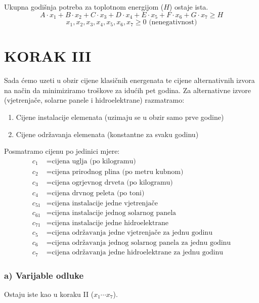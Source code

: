 \documentclass[12pt, a4paper]{paper}
\begin{document}
Ukupna godišnja potreba za toplotnom energijom ($H$) ostaje ista.
\[ A \cdot x_1 + B \cdot x_2 + C \cdot x_3 + D \cdot x_4 + E \cdot x_5 + F \cdot x_6 + G \cdot x_7 \geq H \]
\[ x_1, x_2, x_3, x_4, x_5, x_6, x_7 \geq 0 \text{ (nenegativnost)}\]


\newpage
\section*{KORAK III}

Sada ćemo uzeti u obzir cijene klasičnih energenata te cijene alternativnih izvora na način da minimiziramo troškove za idućih pet godina. Za alternativne izvore (vjetrenjače, solarne panele i hidroelektrane) razmatramo:
\begin{enumerate}
    \item Cijene instalacije elemenata (uzimaju se u obzir samo prve godine)
    \item Cijene održavanja elemenata (konstantne za svaku godinu)
\end{enumerate}

Posmatramo cijenu po jedinici mjere:
\begin{align*}
    c_1 & = \text{cijena uglja (po kilogramu)} \\
    c_2 & = \text{cijena prirodnog plina (po metru kubnom)} \\
    c_3 & = \text{cijena ogrjevnog drveta (po kilogramu)} \\
    c_4 & = \text{cijena drvnog peleta (po toni)} \\
    c_{51} & = \text{cijena instalacije jedne vjetrenjače} \\
    c_{61} & = \text{cijena instalacije jednog solarnog panela} \\
    c_{71} & = \text{cijena instalacije jedne hidroelektrane} \\
    c_5 & = \text{cijena održavanja jedne vjetrenjače za jednu godinu} \\
    c_6 & = \text{cijena održavanja jednog solarnog panela za jednu godinu} \\
    c_7 & = \text{cijena održavanja jedne hidroelektrane za jednu godinu}
\end{align*}

\subsubsection*{a) Varijable odluke}

Ostaju iste kao u koraku II ($x_1\cdots x_7$).
\end{document}
